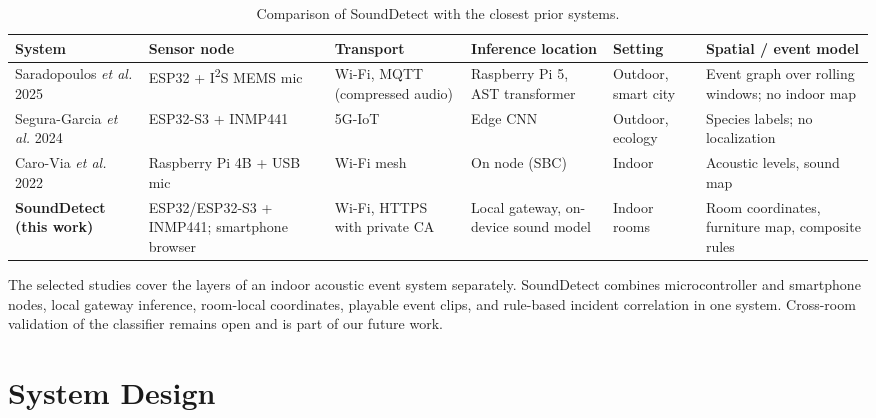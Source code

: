 \documentclass[conference]{IEEEtran}
\begin{document}
\begin{table}[!t]
\centering
\caption{Comparison of SoundDetect with the closest prior systems.}
\label{tab:related}
\renewcommand{\arraystretch}{1.15}
\setlength{\tabcolsep}{4pt}
\begin{tabular}{@{}>{\raggedright\arraybackslash}p{2.6cm}>{\raggedright\arraybackslash}p{3.1cm}>{\raggedright\arraybackslash}p{2.6cm}>{\raggedright\arraybackslash}p{2.7cm}>{\raggedright\arraybackslash}p{1.9cm}>{\raggedright\arraybackslash}p{3.6cm}@{}}
\toprule
\textbf{System} & \textbf{Sensor node} & \textbf{Transport} & \textbf{Inference location} & \textbf{Setting} & \textbf{Spatial / event model} \\
\midrule
Saradopoulos \textit{et al.} 2025~\cite{saradopoulos2025} & ESP32 + I\textsuperscript{2}S MEMS mic & Wi-Fi, MQTT (compressed audio) & Raspberry Pi 5, AST transformer & Outdoor, smart city & Event graph over rolling windows; no indoor map \\
Segura-Garcia \textit{et al.} 2024~\cite{seguragarcia2024} & ESP32-S3 + INMP441 & 5G-IoT & Edge CNN & Outdoor, ecology & Species labels; no localization \\
Caro-Via \textit{et al.} 2022~\cite{carovia2022} & Raspberry Pi 4B + USB mic & Wi-Fi mesh & On node (SBC) & Indoor & Acoustic levels, sound map \\
\textbf{SoundDetect (this work)} & ESP32/ESP32-S3 + INMP441; smartphone browser & Wi-Fi, HTTPS with private CA & Local gateway, on-device sound model & Indoor rooms & Room coordinates, furniture map, composite rules \\
\bottomrule
\end{tabular}
\end{table}

The selected studies cover the layers of an indoor acoustic event system separately. SoundDetect combines microcontroller and smartphone nodes, local gateway inference, room-local coordinates, playable event clips, and rule-based incident correlation in one system. Cross-room validation of the classifier remains open and is part of our future work.

\section{System Design}
\label{sec:design}
\end{document}
